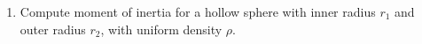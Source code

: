 \documentclass[letterpaper,11pt]{article}
\begin{document}
\begin{enumerate}
  \newline
  \newline
  \newline
  \newline
  \newline
  \newline
  \newline
  \newline
  \newline
  \newline
  \newline
  \newline
  \newline
  \newline
  \newline
  \newline
  \newline
\item Compute moment of inertia for a hollow sphere with inner radius $r_1$ and outer radius $r_2$, with uniform density $\rho$.\\
  \newline
  \newline
  \newline
  \newline
  \newline
  \newline
  \newline
  \newline
  \newline
\end{enumerate}
\end{document}
